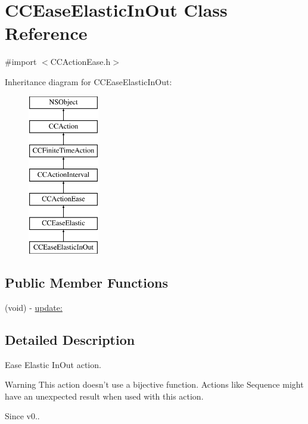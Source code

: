 \hypertarget{interface_c_c_ease_elastic_in_out}{\section{C\-C\-Ease\-Elastic\-In\-Out Class Reference}
\label{interface_c_c_ease_elastic_in_out}
}


{\ttfamily \#import $<$C\-C\-Action\-Ease.\-h$>$}

Inheritance diagram for C\-C\-Ease\-Elastic\-In\-Out\-:\begin{figure}[H]
\begin{center}
\leavevmode
\includegraphics[height=7.000000cm]{interface_c_c_ease_elastic_in_out}
\end{center}
\end{figure}
\subsection*{Public Member Functions}
\begin{DoxyCompactItemize}
\item 
(void) -\/ \hyperlink{interface_c_c_ease_elastic_in_out_abb2ba1b2ee7d9691b7211d494a9b98fd}{update\-:}
\end{DoxyCompactItemize}


\subsection{Detailed Description}
Ease Elastic In\-Out action. \begin{DoxyWarning}{Warning}
This action doesn't use a bijective function. Actions like Sequence might have an unexpected result when used with this action. 
\end{DoxyWarning}
\begin{DoxySince}{Since}
v0.. 
\end{DoxySince}


